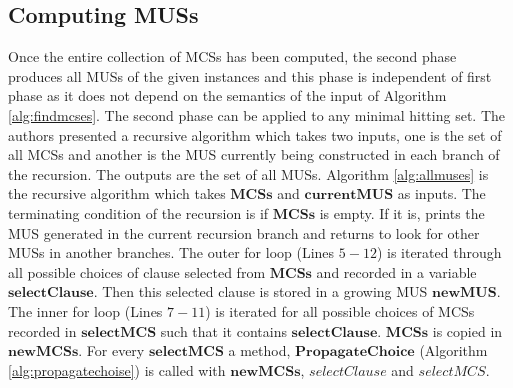 \subsection{Computing MUSs}
Once the entire collection of MCSs has been computed, the second phase produces all MUSs of the given instances and this phase is independent of first phase as it does not depend on the semantics of the input of Algorithm \ref{alg:findmcses}. The second phase can be applied to any minimal hitting set. The authors presented a recursive algorithm which takes two inputs, one is the set of all MCSs and another is the MUS currently being constructed in each branch of the recursion. The outputs are the set of all MUSs.\newline
Algorithm \ref{alg:allmuses} is the recursive algorithm which takes $\mathbf{MCSs}$ and $\mathbf{currentMUS}$ as inputs. The terminating condition of the recursion is if $\mathbf{MCSs}$ is empty. If it is, prints the MUS generated in the current recursion branch and returns to look for other MUSs in another branches. The outer for loop (Lines $5-12$) is iterated through all possible choices of clause selected from $\mathbf{MCSs}$ and recorded in a variable $\mathbf{selectClause}$. Then this selected clause is stored in a growing MUS $\mathbf{newMUS}$. The inner for loop (Lines $7-11$) is iterated for all possible choices of MCSs recorded in $\mathbf{selectMCS}$ such that it contains $\mathbf{selectClause}$. $\mathbf{MCSs}$ is copied in $\mathbf{newMCSs}$.\newline
For every $\mathbf{selectMCS}$ a method, $\mathbf{PropagateChoice}$ (Algorithm \ref{alg:propagatechoise}) is called with $\mathbf{newMCSs}$, $\mathbf{\textit{selectClause}}$ and $\mathbf{\textit{selectMCS}}$.

